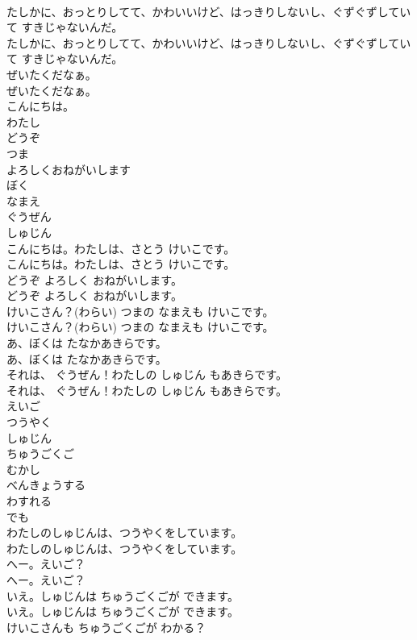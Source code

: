 \documentclass[8pt]{extreport}
\begin{document}
\begin{CJK}{UTF8}{min}
\\	たしかに、おっとりしてて、かわいいけど、はっきりしないし、ぐずぐずしていて すきじゃないんだ。
\\	たしかに、おっとりしてて、かわいいけど、はっきりしないし、ぐずぐずしていて すきじゃないんだ。
\\	ぜいたくだなぁ。
\\	ぜいたくだなぁ。
\\	こんにちは。
\\	わたし
\\	どうぞ
\\	つま
\\	よろしくおねがいします
\\	ぼく
\\	なまえ
\\	ぐうぜん
\\	しゅじん
\\	こんにちは。わたしは、さとう けいこです。
\\	こんにちは。わたしは、さとう けいこです。
\\	どうぞ よろしく おねがいします。
\\	どうぞ よろしく おねがいします。
\\	けいこさん？(わらい) つまの なまえも けいこです。
\\	けいこさん？(わらい) つまの なまえも けいこです。
\\	あ、ぼくは たなかあきらです。
\\	あ、ぼくは たなかあきらです。
\\	それは、 ぐうぜん！わたしの しゅじん もあきらです。
\\	それは、 ぐうぜん！わたしの しゅじん もあきらです。
\\	えいご
\\	つうやく
\\	しゅじん
\\	ちゅうごくご
\\	むかし
\\	べんきょうする
\\	わすれる
\\	でも
\\	わたしのしゅじんは、つうやくをしています。
\\	わたしのしゅじんは、つうやくをしています。
\\	へー。えいご？
\\	へー。えいご？
\\	いえ。しゅじんは ちゅうごくごが できます。　
\\	いえ。しゅじんは ちゅうごくごが できます。　
\\	けいこさんも ちゅうごくごが わかる？

\end{CJK}
\end{document}
